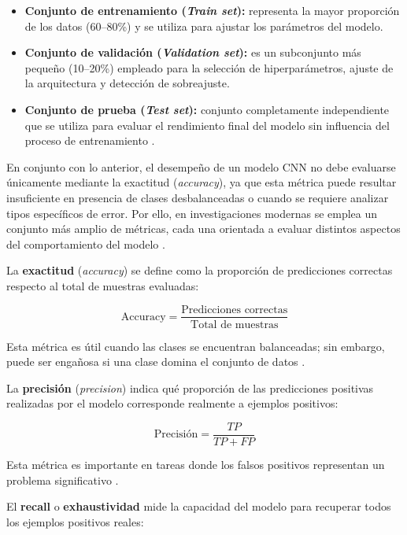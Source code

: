 	\begin{itemize}
		\item \textbf{Conjunto de entrenamiento (\textit{Train set}):} representa la mayor proporción de los datos (60--80\%) y se utiliza para ajustar los parámetros del modelo.
		\item \textbf{Conjunto de validación (\textit{Validation set}):} es un subconjunto más pequeño (10--20\%) empleado para la selección de hiperparámetros, ajuste de la arquitectura y detección de sobreajuste.
		\item \textbf{Conjunto de prueba (\textit{Test set}):} conjunto completamente independiente que se utiliza para evaluar el rendimiento final del modelo sin influencia del proceso de entrenamiento \cite{pan2010}.
	\end{itemize}
	En conjunto con lo anterior, el desempeño de un modelo CNN no debe evaluarse únicamente mediante la exactitud (\textit{accuracy}), ya que esta métrica puede resultar insuficiente en presencia de clases desbalanceadas o cuando se requiere analizar tipos específicos de error. Por ello, en investigaciones modernas se emplea un conjunto más amplio de métricas, cada una orientada a evaluar distintos aspectos del comportamiento del modelo \cite{fawcett2006}.
	
	La \textbf{exactitud} (\textit{accuracy}) se define como la proporción de predicciones correctas respecto al total de muestras evaluadas:
	
	\begin{equation}
		\text{Accuracy} = \frac{\text{Predicciones correctas}}{\text{Total de muestras}}
	\end{equation}
	
	Esta métrica es útil cuando las clases se encuentran balanceadas; sin embargo, puede ser engañosa si una clase domina el conjunto de datos \cite{goodfellow2016dl}.
	
	La \textbf{precisión} (\textit{precision}) indica qué proporción de las predicciones positivas realizadas por el modelo corresponde realmente a ejemplos positivos:
	
	\begin{equation}
		\text{Precisión} = \frac{TP}{TP + FP}
	\end{equation}
	
	Esta métrica es importante en tareas donde los falsos positivos representan un problema significativo \cite{manning2008}.
	
	El \textbf{recall} o \textbf{exhaustividad} mide la capacidad del modelo para recuperar todos los ejemplos positivos reales:
	
